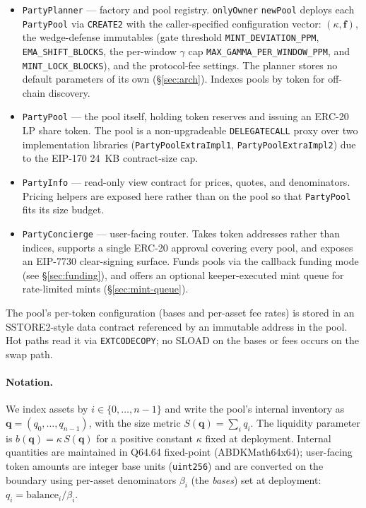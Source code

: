 \documentclass[11pt]{article}
\newcommand{\Sm}{S(\mathbf{q})}
\newcommand{\bofq}{b(\mathbf{q})}
\begin{document}
\begin{itemize}
  \item \texttt{PartyPlanner} --- factory and pool registry. \texttt{onlyOwner}
        \texttt{newPool} deploys each \texttt{PartyPool} via \texttt{CREATE2}
        with the caller-specified configuration vector: $(\kappa,
        \mathbf{f})$, the wedge-defense immutables (gate threshold
        \texttt{MINT\_DEVIATION\_PPM}, \texttt{EMA\_SHIFT\_BLOCKS}, the
        per-window $\gamma$ cap \texttt{MAX\_GAMMA\_PER\_WINDOW\_PPM}, and
        \texttt{MINT\_LOCK\_BLOCKS}), and the protocol-fee settings. The
        planner stores no default parameters of its own
        (\S\ref{sec:arch}). Indexes pools by token for off-chain discovery.
  \item \texttt{PartyPool} --- the pool itself, holding token reserves and
        issuing an ERC-20 LP share token. The pool is a non-upgradeable
        \texttt{DELEGATECALL} proxy over two implementation libraries
        (\texttt{PartyPoolExtraImpl1}, \texttt{PartyPoolExtraImpl2}) due to the
        EIP-170 24~KB contract-size cap.
  \item \texttt{PartyInfo} --- read-only view contract for prices, quotes, and
        denominators. Pricing helpers are exposed here rather than on the pool
        so that \texttt{PartyPool} fits its size budget.
  \item \texttt{PartyConcierge} --- user-facing router. Takes token addresses
        rather than indices, supports a single ERC-20 approval covering every
        pool, and exposes an EIP-7730 clear-signing surface. Funds pools via
        the callback funding mode (see \S\ref{sec:funding}), and offers an
        optional keeper-executed mint queue for rate-limited mints
        (\S\ref{sec:mint-queue}).
\end{itemize}

The pool's per-token configuration (bases and per-asset fee rates) is stored
in an SSTORE2-style data contract referenced by an immutable address in the
pool. Hot paths read it via \texttt{EXTCODECOPY}; no SLOAD on the bases or
fees occurs on the swap path.

\paragraph{Notation.}
We index assets by $i \in \{0,\dots,n-1\}$ and write the pool's internal
inventory as $\mathbf{q} = (q_0,\dots,q_{n-1})$, with the size metric
$\Sm = \sum_i q_i$. The liquidity parameter is $\bofq = \kappa\,\Sm$ for a
positive constant $\kappa$ fixed at deployment. Internal quantities are
maintained in Q64.64 fixed-point (ABDKMath64x64); user-facing token amounts
are integer base units (\texttt{uint256}) and are converted on the boundary
using per-asset denominators $\beta_i$ (the \emph{bases}) set at deployment:
$q_i = \mathrm{balance}_i / \beta_i$.
\end{document}
